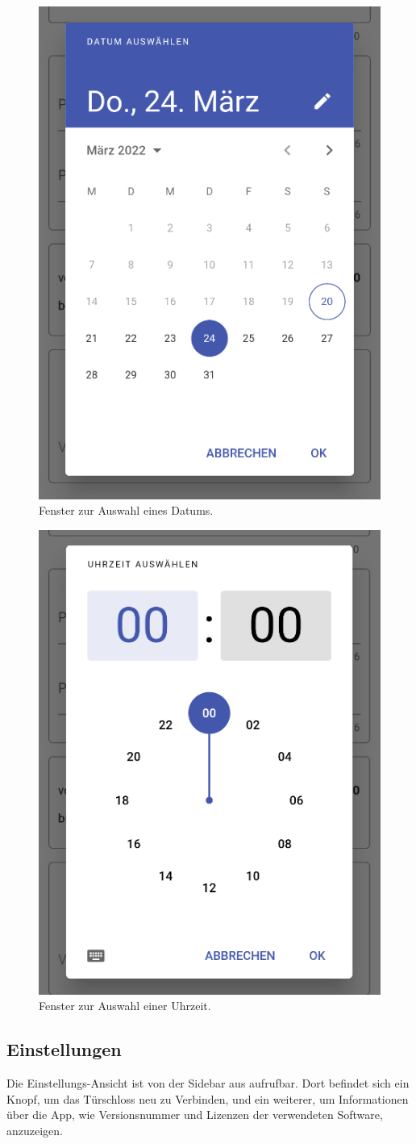 \begin{figure}[H]
    \begin{center}
        \includegraphics[width=.4\textwidth]{images/mobile/DatePicker.png}
        \caption{Fenster zur Auswahl eines Datums. }
    \end{center}
\end{figure}

\begin{figure}[H]
    \begin{center}
        \includegraphics[width=.4\textwidth]{images/mobile/TimePicker.png}
        \caption{Fenster zur Auswahl einer Uhrzeit.}
    \end{center}
\end{figure}

\subsection{Einstellungen}
Die Einstellungs-Ansicht ist von der Sidebar aus aufrufbar. Dort befindet sich ein Knopf, um das Türschloss neu
zu Verbinden, und ein weiterer, um Informationen über die App, wie Versionsnummer und Lizenzen der verwendeten
Software, anzuzeigen.

